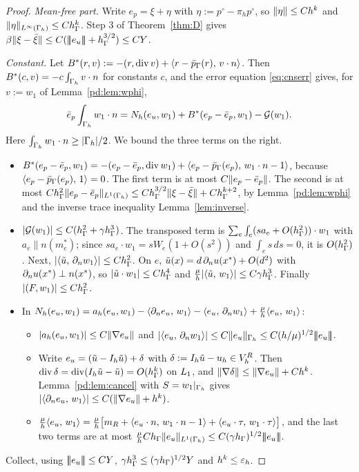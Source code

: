 \begin{proof}
\emph{Mean-free part.} Write $e_p=\xi+\eta$ with $\eta:=p^\circ-\pi_hp^\circ$, so $\lVert \eta\rVert\le Ch^k$ and $\lVert \eta\rVert_{L^\infty(\Gamma_h)}\le Ch_\Gamma^k$. Step 3 of Theorem~\ref{thm:D} gives $\beta\lVert \xi-\bar\xi\rVert\le C(|\!|\!|e_u|\!|\!|+h_\Gamma^{3/2})\le CY$.

\emph{Constant.} Let $B^\ast(r,v):=-(r,\operatorname{div} v)+\langle r-\bar p_{\Gamma}(r),\, v\cdot n\rangle$. Then $B^\ast(c,v)=-c\int_{\Gamma_h}v\cdot n$ for constants $c$, and the error equation \eqref{eq:cnserr} gives, for $v:=w_1$ of Lemma~\ref{pd:lem:wphi},
\begin{equation}\label{pd:eq:const}
\bar e_p\int_{\Gamma_h}w_1\cdot n=N_h(e_u,w_1)+B^\ast(e_p-\bar e_p,w_1)-\mathcal G(w_1).
\end{equation}
Here $\int_{\Gamma_h}w_1\cdot n\ge|\Gamma_h|/2$. We bound the three terms on the right.
\begin{itemize}
\item $B^\ast(e_p-\bar e_p,w_1)=-(e_p-\bar e_p,\operatorname{div} w_1)+\langle e_p-\bar p_{\Gamma}(e_p),\, w_1\cdot n-1\rangle$, because $\langle e_p-\bar p_{\Gamma}(e_p),\, 1\rangle=0$. The first term is at most $C\lVert e_p-\bar e_p\rVert$. The second is at most $Ch_\Gamma^2\lVert e_p-\bar e_p\rVert_{L^1(\Gamma_h)}\le Ch_\Gamma^{3/2}\lVert \xi-\bar\xi\rVert+Ch_\Gamma^{k+2}$, by Lemma~\ref{pd:lem:wphi} and the inverse trace inequality Lemma~\ref{lem:inverse}.
\item $|\mathcal G(w_1)|\le C(h_\Gamma^2+\gamma h_\Gamma^3)$. The transposed term is $\sum_e\int_e(sa_e+O(h_\Gamma^2))\cdot w_1$ with $a_e\parallel n(m_e^\ast)$; since $sa_e\cdot w_1=sW_e(1+O(s^2))$ and $\int_es\,ds=0$, it is $O(h_\Gamma^2)$. Next, $|\langle \tilde u,\, \partial_n w_1\rangle|\le Ch_\Gamma^2$. On $e$, $\tilde u(x)=d\,\partial_n u(x^\ast)+O(d^2)$ with $\partial_n u(x^\ast)\perp n(x^\ast)$, so $|\tilde u\cdot w_1|\le Ch_\Gamma^4$ and $\frac\mu h|\langle \tilde u,\, w_1\rangle|\le C\gamma h_\Gamma^3$. Finally $|(F,w_1)|\le Ch_\Gamma^2$.
\item In $N_h(e_u,w_1)=a_h(e_u,w_1)-\langle \partial_n e_u,\, w_1\rangle-\langle e_u,\, \partial_n w_1\rangle+\frac\mu h\langle e_u,\, w_1\rangle$:
\begin{itemize}
\item $|a_h(e_u,w_1)|\le C\lVert \nabla e_u\rVert$ and $|\langle e_u,\, \partial_n w_1\rangle|\le C\lVert e_u\rVert_{\Gamma_h}\le C(h/\mu)^{1/2}|\!|\!|e_u|\!|\!|$.
\item Write $e_u=(\tilde u-I_h\tilde u)+\delta$ with $\delta:=I_h\tilde u-u_h\in V_h^R$. Then $\operatorname{div}\delta=\operatorname{div}(I_h\tilde u-\tilde u)=O(h_\Gamma^k)$ on $L_1$, and $\lVert \nabla\delta\rVert\le\lVert \nabla e_u\rVert+Ch^k$. Lemma~\ref{pd:lem:cancel} with $S=w_1|_{\Gamma_h}$ gives $|\langle \partial_n e_u,\, w_1\rangle|\le C(\lVert \nabla e_u\rVert+h^k)$.
\item $\frac\mu h\langle e_u,\, w_1\rangle=\frac\mu h\bigl[m_R+\langle e_u\cdot n,\, w_1\cdot n-1\rangle+\langle e_u\cdot\tau,\, w_1\cdot\tau\rangle\bigr]$, and the last two terms are at most $\frac\mu hCh_\Gamma\lVert e_u\rVert_{L^1(\Gamma_h)}\le C(\gamma h_\Gamma)^{1/2}|\!|\!|e_u|\!|\!|$.
\end{itemize}
\end{itemize}
Collect, using $|\!|\!|e_u|\!|\!|\le CY$, $\gamma h_\Gamma^3\le(\gamma h_\Gamma)^{1/2}Y$ and $h^k\le\varepsilon_h$.


\end{proof}
